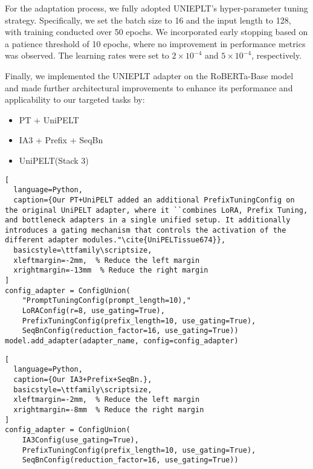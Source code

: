 \documentclass[10pt,twocolumn,letterpaper]{article}
\begin{document}
For the adaptation process, we fully adopted UNIEPLT's hyper-parameter tuning strategy. Specifically, we set the batch size to 16 and the input length to 128, with training conducted over 50 epochs. We incorporated early stopping based on a patience threshold of 10 epochs, where no improvement in performance metrics was observed. The learning rates were set to $2 \times 10^{-4}$ and $5 \times 10^{-4}$, respectively.

Finally, we implemented the UNIEPLT adapter on the RoBERTa-Base model and made further architectural improvements to enhance its performance and applicability to our targeted tasks by:

\begin{itemize}
    \small %
    \setlength\itemsep{-0.5em} %
    \item PT + UniPELT
    \item IA3 + Prefix + SeqBn
    \item UniPELT(Stack 3)
\end{itemize}


\begin{lstlisting}[
  language=Python,
  caption={Our PT+UniPELT added an additional PrefixTuningConfig on the original UniPELT adapter, where it ``combines LoRA, Prefix Tuning, and bottleneck adapters in a single unified setup. It additionally introduces a gating mechanism that controls the activation of the different adapter modules."\cite{UniPELTissue674}},
  basicstyle=\ttfamily\scriptsize,  
  xleftmargin=-2mm,  % Reduce the left margin
  xrightmargin=-13mm  % Reduce the right margin
]
config_adapter = ConfigUnion(
    "PromptTuningConfig(prompt_length=10),"
    LoRAConfig(r=8, use_gating=True),
    PrefixTuningConfig(prefix_length=10, use_gating=True),
    SeqBnConfig(reduction_factor=16, use_gating=True))
model.add_adapter(adapter_name, config=config_adapter)
\end{lstlisting}



\begin{lstlisting}[
  language=Python,
  caption={Our IA3+Prefix+SeqBn.},
  basicstyle=\ttfamily\scriptsize,  
  xleftmargin=-2mm,  % Reduce the left margin
  xrightmargin=-8mm  % Reduce the right margin
]
config_adapter = ConfigUnion(
    IA3Config(use_gating=True),
    PrefixTuningConfig(prefix_length=10, use_gating=True),
    SeqBnConfig(reduction_factor=16, use_gating=True))
\end{lstlisting}
\end{document}
